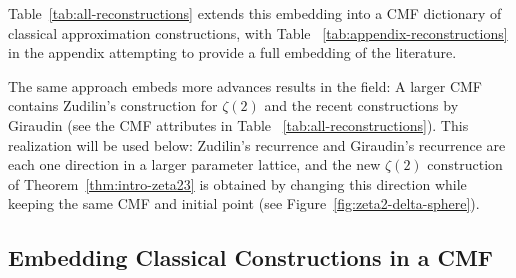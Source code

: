 \documentclass[oneside,english,11pt]{amsart}
\begin{document}
Table~\ref{tab:all-reconstructions} extends this embedding into a CMF dictionary of classical approximation constructions, with Table ~\ref{tab:appendix-reconstructions} in the appendix attempting to provide a full embedding of the literature.

The same approach embeds more advances results in the field: A larger CMF contains Zudilin's construction for $\zeta(2)$ \cite{zudilin2014zeta2} and the recent constructions by Giraudin  \cite{giraudin2026zeta2} (see the CMF attributes in Table ~\ref{tab:all-reconstructions}). 
This realization will be used below: Zudilin's recurrence and Giraudin's recurrence are each one direction in a larger parameter lattice, and the new $\zeta(2)$ construction of Theorem~\ref{thm:intro-zeta23} is obtained by changing this direction while keeping the same CMF and initial point (see Figure~\ref{fig:zeta2-delta-sphere}).


\clearpage
\subsection{Embedding Classical Constructions in a CMF}


\end{document}
